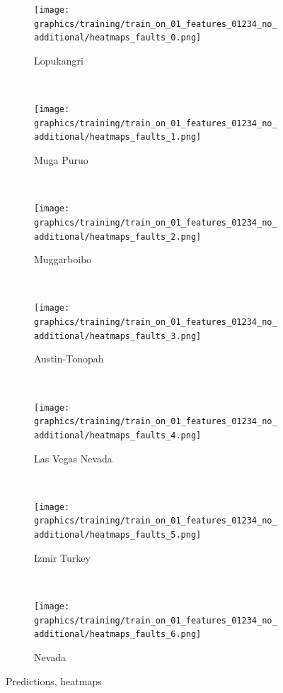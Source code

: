 \documentclass[11pt,a4paper]{article}
\begin{document}
\begin{figure}[t]
    \centering
    \begin{subfigure}[b]{0.12\textwidth}
        \texttt{[image: graphics/training/train\_on\_01\_features\_01234\_no\_additional/heatmaps\_faults\_0.png]}
        \caption{Lopukangri}
        \label{fig:heatmaps_2_Lopukangri}
    \end{subfigure}
    ~
    \begin{subfigure}[b]{0.12\textwidth}
        \texttt{[image: graphics/training/train\_on\_01\_features\_01234\_no\_additional/heatmaps\_faults\_1.png]}
        \caption{Muga Puruo}
        \label{fig:heatmaps_2_Muga_Puruo}
    \end{subfigure}
    ~
    \begin{subfigure}[b]{0.12\textwidth}
        \texttt{[image: graphics/training/train\_on\_01\_features\_01234\_no\_additional/heatmaps\_faults\_2.png]}
        \caption{Muggarboibo}
        \label{fig:heatmaps_2_Muggarboibo}
    \end{subfigure}
    ~
    \begin{subfigure}[b]{0.12\textwidth}
        \texttt{[image: graphics/training/train\_on\_01\_features\_01234\_no\_additional/heatmaps\_faults\_3.png]}
        \caption{Austin-Tonopah}
        \label{fig:heatmaps_2_Austin-Tonopah}
    \end{subfigure}
    ~
    \begin{subfigure}[b]{0.12\textwidth}
        \texttt{[image: graphics/training/train\_on\_01\_features\_01234\_no\_additional/heatmaps\_faults\_4.png]}
        \caption{Las Vegas Nevada}
        \label{fig:heatmaps_2_Las_Vegas_Nevada}
    \end{subfigure}
    ~
    \begin{subfigure}[b]{0.12\textwidth}
        \texttt{[image: graphics/training/train\_on\_01\_features\_01234\_no\_additional/heatmaps\_faults\_5.png]}
        \caption{Izmir Turkey}
        \label{fig:heatmaps_2_Izmir_Turkey}
    \end{subfigure}
    ~
    \begin{subfigure}[b]{0.12\textwidth}
        \texttt{[image: graphics/training/train\_on\_01\_features\_01234\_no\_additional/heatmaps\_faults\_6.png]}
        \caption{Nevada}
        \label{fig:heatmaps_2_Nevada}
    \end{subfigure}

    \caption{Predictions, heatmaps}\label{fig:train_on_01_features_01234_no_additional_im}
\end{figure}
\end{document}
